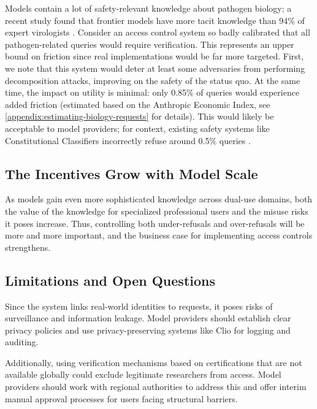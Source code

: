 \documentclass{article}
\theoremstyle{plain}
\theoremstyle{definition}
\theoremstyle{remark}
\begin{document}
Models contain a lot of safety-relevant knowledge about pathogen biology; a recent study found that frontier models have more tacit knowledge than 94\% of expert virologists \cite{gotting2025virologycapabilitiestestvct}.
Consider an access control system so badly calibrated that all pathogen-related queries would require verification.
This represents an upper bound on friction since real implementations would be far more targeted.
First, we note that this system would deter at least some adversaries from performing decomposition attacks, improving on the safety of the status quo.
At the same time, the impact on utility is minimal: only 0.85\% of queries would experience added friction (estimated based on the Anthropic Economic Index, see \cref{appendix:estimating-biology-requests} for details).
This would likely be acceptable to model providers; for context, existing safety systems like Constitutional Classifiers incorrectly refuse around 0.5\% queries \cite{sharma2025constitutionalclassifiersdefendinguniversal}.

\subsection{The Incentives Grow with Model Scale}

As models gain even more sophisticated knowledge across dual-use domains, both the value of the knowledge for specialized professional users and the misuse risks it poses increase.
Thus, controlling both under-refusals and over-refusals will be more and more important, and the business case for implementing access controls strengthens.

\subsection{Limitations and Open Questions}

Since the system links real-world identities to requests, it poses risks of surveillance and information leakage.
Model providers should establish clear privacy policies and use privacy-preserving systems like Clio \cite{tamkin2024clioprivacypreservinginsightsrealworld} for logging and auditing.

Additionally, using verification mechanisms based on certifications that are not available globally could exclude legitimate researchers from access.
Model providers should work with regional authorities to address this and offer interim manual approval processes for users facing structural barriers.
\end{document}
